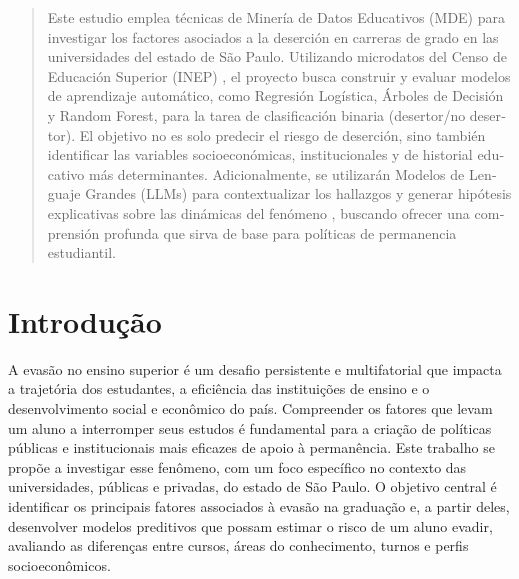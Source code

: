 \documentclass[brazilian, english, spanish]{RBIEarticle}
\begin{document}
\begin{otherlanguage}{spanish}
\begin{abstract}
Este estudio emplea técnicas de Minería de Datos Educativos (MDE) para investigar los factores asociados a la deserción en carreras de grado en las universidades del estado de São Paulo. Utilizando microdatos del Censo de Educación Superior (INEP) , el proyecto busca construir y evaluar modelos de aprendizaje automático, como Regresión Logística, Árboles de Decisión y Random Forest, para la tarea de clasificación binaria (desertor/no desertor). El objetivo no es solo predecir el riesgo de deserción, sino también identificar las variables socioeconómicas, institucionales y de historial educativo más determinantes. Adicionalmente, se utilizarán Modelos de Lenguaje Grandes (LLMs) para contextualizar los hallazgos y generar hipótesis explicativas sobre las dinámicas del fenómeno , buscando ofrecer una comprensión profunda que sirva de base para políticas de permanencia estudiantil.
\end{abstract}
\end{otherlanguage}

\section{Introdução}
A evasão no ensino superior é um desafio persistente e multifatorial que impacta a trajetória dos estudantes, a eficiência das instituições de ensino e o desenvolvimento social e econômico do país. Compreender os fatores que levam um aluno a interromper seus estudos é fundamental para a criação de políticas públicas e institucionais mais eficazes de apoio à permanência. Este trabalho se propõe a investigar esse fenômeno, com um foco específico no contexto das universidades, públicas e privadas, do estado de São Paulo. O objetivo central é identificar os principais fatores associados à evasão na graduação e, a partir deles, desenvolver modelos preditivos que possam estimar o risco de um aluno evadir, avaliando as diferenças entre cursos, áreas do conhecimento, turnos e perfis socioeconômicos.
\end{document}
